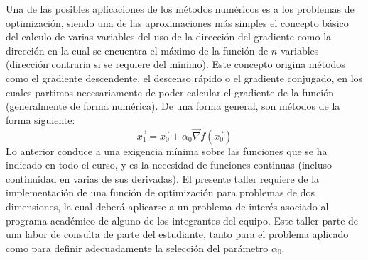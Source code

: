\documentclass[12pt]{article}
\begin{document}
Una de las posibles aplicaciones de los métodos numéricos es a los problemas de optimización, siendo una de las aproximaciones más simples el concepto básico del calculo de varias variables del uso de la dirección del gradiente como la dirección en la cual se encuentra el máximo de la función de \(n\) variables (dirección contraria si se requiere del mínimo). Este concepto origina métodos como el gradiente descendente, el descenso rápido o el gradiente conjugado, en los cuales partimos necesariamente de poder calcular el gradiente de la función (generalmente de forma numérica).
De una forma general, son métodos de la forma siguiente: \[ \vec{x_1} = \vec{x_0}+\alpha_0\vec{\nabla}f(\vec{x_0}) \]
Lo anterior conduce a una exigencia mínima sobre las funciones que se ha indicado en todo el curso, y es la necesidad de funciones continuas (incluso continuidad en varias de sus derivadas).
El presente taller requiere de la implementación de una función de optimización para problemas de dos dimensiones, la cual deberá aplicarse a un problema de interés asociado al programa académico de alguno de los integrantes del equipo. Este taller parte de una labor de consulta de parte del estudiante, tanto para el problema aplicado como para definir adecuadamente la selección del parámetro \(\alpha_0\).
\vspace{-.5cm}
\end{document}
